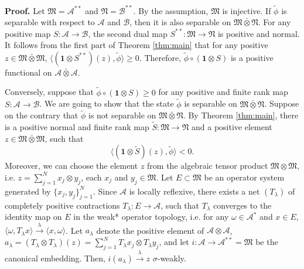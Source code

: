 {\bf Proof.} Let $\mathfrak{M}=\mathcal{A}^{**}$ and $\mathfrak{N}=\mathcal{B}^{**}$.
By the assumption, $\mathfrak{M}$ is injective. If $\tilde{\phi}$ is separable with respect to
$\mathcal{A}$ and $\mathcal{B}$, then it is also separable on
$\mathfrak{M} \bar{\otimes} \mathfrak{N}$. For any positive map
$S: \mathcal{A} \rightarrow \mathcal{B}$, the second dual map
$S^{**}:\mathfrak{M} \rightarrow \mathfrak{N}$ is positive and normal.
It follows from the first part of Theorem \ref{thm:main} that for any positive
$z \in \mathfrak{M} \bar{\otimes} \mathfrak{M}$,
$\langle (\mathbf{1} \otimes S^{**})(z), \tilde{\phi} \rangle \geq 0$.
Therefore, $\tilde{\phi} \circ (\mathbf{1} \otimes S)$ is a
positive functional on $\mathcal{A} \bar{\otimes} \mathcal{A}$.

Conversely, suppose that $\tilde{\phi} \circ (\mathbf{1} \otimes S) \geq 0$
for any positive and finite rank map $S: \mathcal{A} \rightarrow \mathcal{B}$.
We are going to show that the state $\tilde{\phi}$
is separable on $\mathfrak{M} \bar{\otimes} \mathfrak{N}$.
Suppose on the contrary that $\tilde{\phi}$ is not separable on
$\mathfrak{M} \bar{\otimes} \mathfrak{N}$.
By Theorem \ref{thm:main}, there is a positive normal and finite rank
map $\tilde{S}: \mathfrak{M} \rightarrow \mathfrak{N}$
and a positive element $z \in \mathfrak{M} \bar{\otimes} \mathfrak{M}$,
such that
\begin{equation}
\label{eq:Random6347}
\langle(\mathbf{1} \otimes \tilde{S})(z), \tilde{\phi}\rangle < 0.
\end{equation}
Moreover, we can choose the element $z$ from the algebraic tensor product
$\mathfrak{M} \otimes \mathfrak{M}$, i.e. $z = \sum_{j=1}^{N} x_{j} \otimes y_{j}$,
each $x_{j}$ and $y_{j} \in \mathfrak{M}$. Let $E \subset \mathfrak{M}$ be an
operator system generated by $\{ x_{j}, y_{j}\}_{j=1}^{N}$.
Since $\mathcal{A}$ is locally reflexive, there exists
a net $(T_{\lambda})$ of completely positive contractions
$T_{\lambda}: E \rightarrow \mathcal{A}$,
such that $T_{\lambda}$ converges to the identity map
on $E$ in the weak* operator topology, i.e.
for any $\omega \in \mathcal{A}^{*}$ and $x \in E$,
$ \langle \omega, T_{\lambda}x \rangle\stackrel{\lambda}{\rightarrow}
\langle x, \omega \rangle$. Let $a_{\lambda}$ denote the positive element
of $\mathcal{A} \otimes \mathcal{A}$,
$a_{\lambda} = (T_{\lambda} \otimes T_{\lambda}) (z) =
\sum_{j=1}^{N} T_{\lambda} x_{j} \otimes T_{\lambda} y_{j}$, and let
$i: \mathcal{A} \rightarrow \mathcal{A}^{**}=\mathfrak{M}$
be the canonical embedding. Then,
$i(a_{\lambda}) \stackrel{\lambda}{\rightarrow} z$ $\sigma$-weakly.
